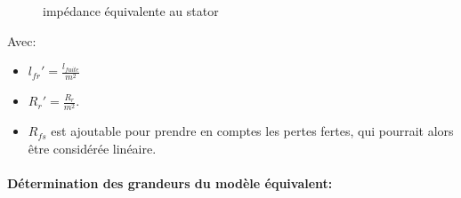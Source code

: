 \documentclass[main.tex]{subfiles}
\begin{document}
\begin{figure}[H]
  \centering
  \caption{impédance équivalente au stator}
\end{figure}

Avec:
\begin{itemize}
\item $ l_{fr}' = \frac{l_{fuite}}{m^2} $
\item  $R_r' = \frac{R_r}{m^2}$.
\item $R_{fs}$ est ajoutable pour prendre en comptes les pertes fertes, qui pourrait alors être considérée linéaire.
\end{itemize}

\paragraph{Détermination des grandeurs du modèle équivalent:}
\end{document}
